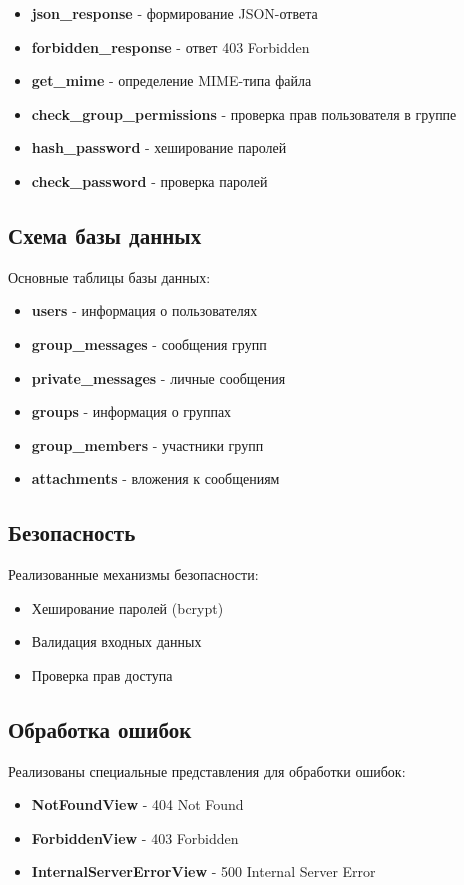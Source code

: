 \begin{itemize}
	\item \textbf{json\_response} - формирование JSON-ответа
	\item \textbf{forbidden\_response} - ответ 403 Forbidden
	\item \textbf{get\_mime} - определение MIME-типа файла
	\item \textbf{check\_group\_permissions} - проверка прав пользователя в группе
	\item \textbf{hash\_password} - хеширование паролей
	\item \textbf{check\_password} - проверка паролей
\end{itemize}

\subsection{Схема базы данных}

Основные таблицы базы данных:
\begin{itemize}
	\item \textbf{users} - информация о пользователях
	\item \textbf{group\_messages} - сообщения групп
	\item \textbf{private\_messages} - личные сообщения
	\item \textbf{groups} - информация о группах
	\item \textbf{group\_members} - участники групп
	\item \textbf{attachments} - вложения к сообщениям
\end{itemize}

\subsection{Безопасность}

Реализованные механизмы безопасности:
\begin{itemize}
	\item Хеширование паролей (bcrypt)
	\item Валидация входных данных
	\item Проверка прав доступа
\end{itemize}

\subsection{Обработка ошибок}

Реализованы специальные представления для обработки ошибок:
\begin{itemize}
	\item \textbf{NotFoundView} - 404 Not Found
	\item \textbf{ForbiddenView} - 403 Forbidden
	\item \textbf{InternalServerErrorView} - 500 Internal Server Error
\end{itemize}